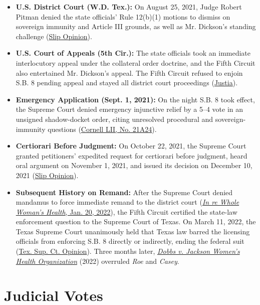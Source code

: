 \documentclass[12pt]{article}
\begin{document}
\begin{itemize}
    \item \textbf{U.S. District Court (W.D. Tex.):} On August 25, 2021, Judge Robert Pitman denied the state officials' Rule 12(b)(1) motions to dismiss on sovereign immunity and Article III grounds, as well as Mr. Dickson's standing challenge (\href{https://www.supremecourt.gov/opinions/21pdf/21-463_3ebh.pdf}{Slip Opinion}).
    \item \textbf{U.S. Court of Appeals (5th Cir.):} The state officials took an immediate interlocutory appeal under the collateral order doctrine, and the Fifth Circuit also entertained Mr. Dickson's appeal. The Fifth Circuit refused to enjoin S.B. 8 pending appeal and stayed all district court proceedings (\href{https://supreme.justia.com/cases/federal/us/595/21-463/}{Justia}).
    \item \textbf{Emergency Application (Sept. 1, 2021):} On the night S.B. 8 took effect, the Supreme Court denied emergency injunctive relief by a 5--4 vote in an unsigned shadow-docket order, citing unresolved procedural and sovereign-immunity questions (\href{https://www.law.cornell.edu/supremecourt/text/21A24}{Cornell LII, No. 21A24}).
    \item \textbf{Certiorari Before Judgment:} On October 22, 2021, the Supreme Court granted petitioners' expedited request for certiorari before judgment, heard oral argument on November 1, 2021, and issued its decision on December 10, 2021 (\href{https://www.supremecourt.gov/opinions/21pdf/21-463_3ebh.pdf}{Slip Opinion}).
    \item \textbf{Subsequent History on Remand:} After the Supreme Court denied mandamus to force immediate remand to the district court (\href{https://www.law.cornell.edu/supremecourt/text/21-962}{\textit{In re Whole Woman's Health}, Jan. 20, 2022}), the Fifth Circuit certified the state-law enforcement question to the Supreme Court of Texas. On March 11, 2022, the Texas Supreme Court unanimously held that Texas law barred the licensing officials from enforcing S.B. 8 directly or indirectly, ending the federal suit (\href{https://www.txcourts.gov/media/1453763/220033.pdf}{Tex. Sup. Ct. Opinion}). Three months later, \href{https://www.supremecourt.gov/opinions/21pdf/19-1392_6j37.pdf}{\textit{Dobbs v. Jackson Women's Health Organization}} (2022) overruled \textit{Roe} and \textit{Casey}.
\end{itemize}

\section{Judicial Votes}
\end{document}
